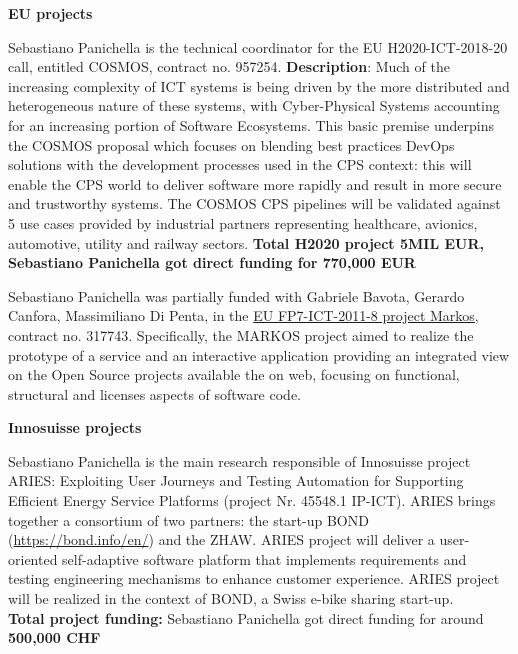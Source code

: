 \documentclass[10pt]{article}
\newcommand{\ins}[1]{\textcolor{blue}{\uline{#1}}} %
\newcommand{\ins}[1]{#1} %
\newcommand\on[1]{\nbc{ON}{#1}{red}} %
\begin{document}
\textbf{EU projects}
\begin{innerlist}
\item Sebastiano Panichella is the technical coordinator for the EU H2020-ICT-2018-20 call, entitled COSMOS, contract no. 957254. \textbf{Description}: Much of the increasing complexity of ICT systems is being driven by the more distributed and heterogeneous nature of these systems, with Cyber-Physical Systems accounting for an increasing portion of Software Ecosystems. This basic premise underpins the COSMOS proposal which focuses on blending best practices DevOps solutions with the development processes used in the CPS context: this will enable the CPS world to deliver software more rapidly and result in more secure and trustworthy systems. 
The COSMOS CPS pipelines will be validated against 5 use cases provided by industrial partners representing healthcare, avionics, automotive, utility and railway sectors.  
\textbf{Total H2020 project 5MIL EUR, Sebastiano Panichella got direct funding for 770,000 EUR} 
   \item Sebastiano Panichella was 
    partially funded with Gabriele Bavota, Gerardo Canfora, Massimiliano Di Penta, in the \href{��http://www.markosproject.eu/��}
                   {EU FP7-ICT-2011-8 project Markos}, contract no. 317743. Specifically, the MARKOS project aimed to realize the prototype of a service and an interactive application providing an integrated view on the Open Source projects available the on web, focusing on functional, structural and licenses aspects of software code. 
\end{innerlist}
\textbf{Innosuisse projects}
\begin{innerlist}
   \item Sebastiano Panichella is the main research responsible of Innosuisse project ARIES: Exploiting User Journeys and Testing Automation for Supporting Efficient Energy Service Platforms (project Nr. 45548.1 IP-ICT).
ARIES brings together a consortium of two partners: the start-up BOND (\href{https://bond.info/en/}{https://bond.info/en/}) and the ZHAW.
ARIES project will deliver a user-oriented self-adaptive software platform that implements requirements and testing engineering mechanisms to enhance customer experience. ARIES project will be realized in the context of BOND, a Swiss e-bike sharing start-up.\\
\textbf{Total project funding:} Sebastiano Panichella got direct funding for around \textbf{500,000 CHF}\\
\end{innerlist}
\end{document}
